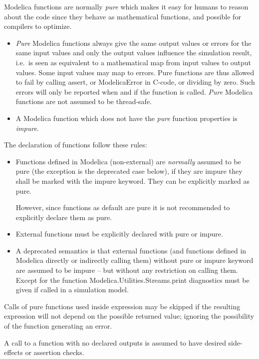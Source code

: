 Modelica functions are normally \emph{pure} which makes it easy for
humans to reason about the code since they behave as mathematical
functions, and possible for compilers to optimize.

\begin{itemize}
\item
  \emph{Pure} Modelica functions always give the same output values or
  errors for the same input values and only the output values influence
  the simulation result, i.e.\ is seen as equivalent to a mathematical
  map from input values to output values. Some input values may map to
  errors. Pure functions are thus allowed to fail by calling assert, or
  ModelicaError in C-code, or dividing by zero. Such errors will only be
  reported when and if the function is called.  \emph{Pure} Modelica
  functions are not assumed to be thread-safe.
\item
  A Modelica function which does not have the \emph{pure} function
  properties is \emph{impure}.
\end{itemize}

The declaration of functions follow these rules:
\begin{itemize}
\item
  Functions defined in Modelica (non-external) are \emph{normally}
  assumed to be pure (the exception is the deprecated case below), if
  they are impure they shall be marked with the impure keyword. They can
  be explicitly marked as pure.
  \begin{nonnormative}
  However, since functions as default are pure it is not recommended to explicitly declare them as pure.
  \end{nonnormative}
\item
  External functions must be explicitly declared with pure or impure.
\item
  A deprecated semantics is that external functions (and functions
  defined in Modelica directly or indirectly calling them) without pure
  or impure keyword are assumed to be impure -- but without any
  restriction on calling them. Except for the function
  Modelica.Utilities.Streams.print diagnostics must be given if called
  in a simulation model.
\end{itemize}

Calls of pure functions used inside expression may be skipped if the
resulting expression will not depend on the possible returned value;
ignoring the possibility of the function generating an error.

A call to a function with no declared outputs is assumed to have desired
side-effects or assertion checks.

